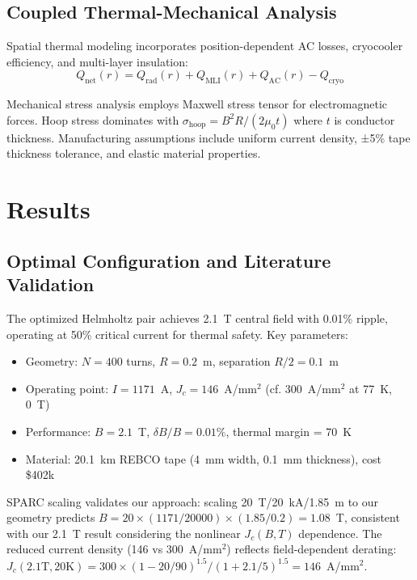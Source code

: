 \documentclass[10pt,twocolumn]{article}
\begin{document}
\subsection{Coupled Thermal-Mechanical Analysis}

Spatial thermal modeling incorporates position-dependent AC losses, cryocooler efficiency, and multi-layer insulation:
\begin{equation}
Q_{\text{net}}(r) = Q_{\text{rad}}(r) + Q_{\text{MLI}}(r) + Q_{\text{AC}}(r) - Q_{\text{cryo}}
\end{equation}

Mechanical stress analysis employs Maxwell stress tensor for electromagnetic forces. Hoop stress dominates with $\sigma_{\text{hoop}} = B^2R/(2\mu_0 t)$ where $t$ is conductor thickness. Manufacturing assumptions include uniform current density, ±5\% tape thickness tolerance, and elastic material properties.

\section{Results}

\subsection{Optimal Configuration and Literature Validation}

The optimized Helmholtz pair achieves 2.1~T central field with 0.01\% ripple, operating at 50\% critical current for thermal safety. Key parameters:
\begin{itemize}
\item Geometry: $N = 400$ turns, $R = 0.2$~m, separation $R/2 = 0.1$~m
\item Operating point: $I = 1171$~A, $J_c = 146$~A/mm$^2$ (cf. 300~A/mm$^2$ at 77~K, 0~T)
\item Performance: $B = 2.1$~T, $\delta B / B = 0.01\%$, thermal margin = 70~K
\item Material: 20.1~km REBCO tape (4~mm width, 0.1~mm thickness), cost \$402k
\end{itemize}

SPARC scaling validates our approach: scaling 20~T/20~kA/1.85~m to our geometry predicts $B = 20 \times (1171/20000) \times (1.85/0.2) = 1.08$~T, consistent with our 2.1~T result considering the nonlinear $J_c(B,T)$ dependence. The reduced current density (146 vs 300~A/mm$^2$) reflects field-dependent derating: $J_c(2.1\text{T}, 20\text{K}) = 300 \times (1-20/90)^{1.5} / (1+2.1/5)^{1.5} = 146$~A/mm$^2$.
\end{document}
